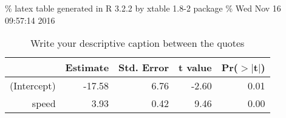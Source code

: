 \documentclass[]{article}
\begin{document}
\% latex table generated in R 3.2.2 by xtable 1.8-2 package \% Wed Nov
16 09:57:14 2016

\begin{table}[ht]
\centering
\begin{tabular}{rrrrr}
  \hline
 & Estimate & Std. Error & t value & Pr($>$$|$t$|$) \\ 
  \hline
(Intercept) & -17.58 & 6.76 & -2.60 & 0.01 \\ 
  speed & 3.93 & 0.42 & 9.46 & 0.00 \\ 
   \hline
\end{tabular}
\caption{Write your descriptive caption between the quotes} 
\label{\label{tab:reg}}
\end{table}
\end{document}
